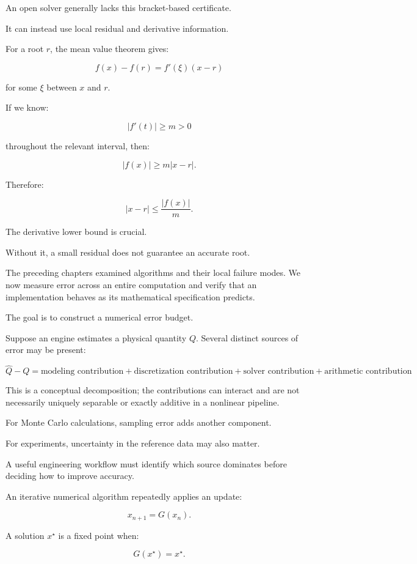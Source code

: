 An open solver generally lacks this bracket-based certificate.

It can instead use local residual and derivative information.

For a root \(r\), the mean value theorem gives:

\[ f(x)-f(r)=f'(\xi)(x-r) \]

for some \(\xi\) between \(x\) and \(r\).

If we know:

\[ |f'(t)|\ge m>0 \]

throughout the relevant interval, then:

\[ |f(x)|\ge m|x-r|. \]

Therefore:

\[ \boxed{ |x-r|\le\frac{|f(x)|}{m} }. \]

The derivative lower bound is crucial.

Without it, a small residual does not guarantee an accurate root.

The preceding chapters examined algorithms and their local failure modes. We now measure error across an entire computation and verify that an implementation behaves as its mathematical specification predicts.

The goal is to construct a numerical error budget.

Suppose an engine estimates a physical quantity \(Q\). Several distinct sources of error may be present:

\[ \boxed{ \hat Q-Q = \text{modeling contribution} + \text{discretization contribution} + \text{solver contribution} + \text{arithmetic contribution} } \]

This is a conceptual decomposition; the contributions can interact and are not necessarily uniquely separable or exactly additive in a nonlinear pipeline.

For Monte Carlo calculations, sampling error adds another component.

For experiments, uncertainty in the reference data may also matter.

A useful engineering workflow must identify which source dominates before deciding how to improve accuracy.

An iterative numerical algorithm repeatedly applies an update:

\[ \boxed{ x_{n+1}=G(x_n) }. \]

A solution \(x^\star\) is a fixed point when:

\[ \boxed{ G(x^\star)=x^\star }. \]

